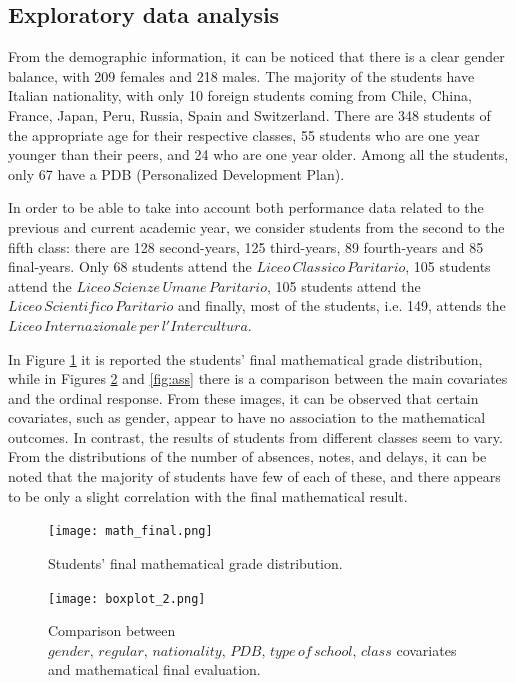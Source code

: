 \subsection{Exploratory data analysis}
\label{sec:exp_analisys}
From the demographic information, it can be noticed that there is a clear gender balance, with 209 females and 218 males. The majority of the students have Italian nationality, with only 10 foreign students coming from Chile, China, France, Japan, Peru, Russia, Spain and Switzerland.
There are 348 students of the appropriate age for their respective classes, 55 students who are one year younger than their peers, and 24 who are one year older. Among all the students, only 67 have a PDB (Personalized Development Plan).

In order to be able to take into account both performance data related to the previous and current academic year, we consider students from the second to the fifth class: there are 128 second-years, 125 third-years, 89 fourth-years and 85 final-years.
Only 68 students attend the \(Liceo \, Classico \, Paritario\), 105 students attend the \(Liceo \, Scienze \, Umane \, Paritario\), 105 students attend the \(Liceo \, Scientifico \, Paritario\) and finally, most of the students, i.e. 149, attends the \(Liceo \, Internazionale \, per \, l'Intercultura\).

In Figure \ref{fig:math} it is reported the students' final mathematical  grade distribution, while in Figures \ref{fig:box} and \ref{fig:ass} there is a comparison between the main covariates and the ordinal response.
From these images, it can be observed that certain covariates, such as gender, appear to have no association to the mathematical outcomes. In contrast, the results of students from different classes seem to vary.
From the distributions of the number of absences, notes, and delays, it can be noted that the majority of students have few of each of these, and there appears to be only a slight correlation with the final mathematical result.

\begin{figure}[H]
    \centering
    \texttt{[image: math\_final.png]}
    \caption{Students' final mathematical grade distribution.}
    \label{fig:math}
\end{figure}

\begin{figure}[H]
    \centering
    \texttt{[image: boxplot\_2.png]}
    \caption{Comparison between \(gender, \, regular, \, nationality, \, PDB, \, type\,of\,school, \, class\) covariates and mathematical final evaluation.}
    \label{fig:box}
\end{figure}

